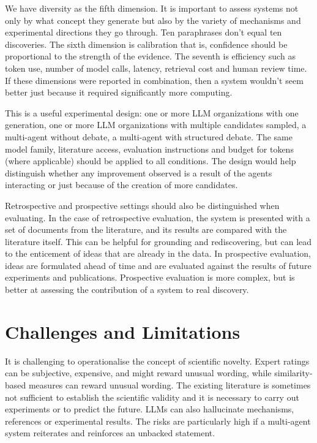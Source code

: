 \documentclass[acmsmall,screen,review]{acmart}
\begin{document}
We have diversity as the fifth dimension. It is important to assess systems not only by what concept they generate but also by the variety of mechanisms and experimental directions they go through. Ten paraphrases don't equal ten discoveries. The sixth dimension is calibration that is, confidence should be proportional to the strength of the evidence. The seventh is efficiency such as token use, number of model calls, latency, retrieval cost and human review time. If these dimensions were reported in combination, then a system wouldn't seem better just because it required significantly more computing.

This is a useful experimental design: one or more LLM organizations with one generation, one or more LLM organizations with multiple candidates sampled, a multi-agent without debate, a multi-agent with structured debate. The same model family, literature access, evaluation instructions and budget for tokens (where applicable) should be applied to all conditions. The design would help distinguish whether any improvement observed is a result of the agents interacting or just because of the creation of more candidates.

Retrospective and prospective settings should also be distinguished when evaluating. In the case of retrospective evaluation, the system is presented with a set of documents from the literature, and its results are compared with the literature itself. This can be helpful for grounding and rediscovering, but can lead to the enticement of ideas that are already in the data. In prospective evaluation, ideas are formulated ahead of time and are evaluated against the results of future experiments and publications. Prospective evaluation is more complex, but is better at assessing the contribution of a system to real discovery.


\section{Challenges and Limitations}
\label{sec:challenges}

It is challenging to operationalise the concept of scientific novelty. Expert ratings can be subjective, expensive, and might reward unusual wording, while similarity-based measures can reward unusual wording. The existing literature is sometimes not sufficient to establish the scientific validity and it is necessary to carry out experiments or to predict the future. LLMs can also hallucinate mechanisms, references or experimental results. The risks are particularly high if a multi-agent system reiterates and reinforces an unbacked statement.
\end{document}
